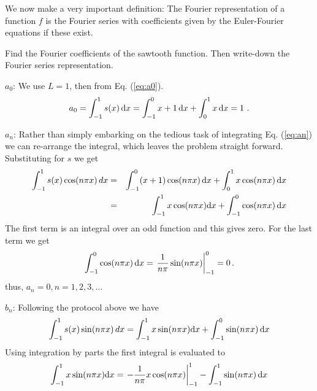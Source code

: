 \noindent We now make a very important definition: The Fourier representation of a function $f$ is the Fourier
series with coefficients given by the Euler-Fourier equations if these exist.  

\begin{example}
	Find the Fourier coefficients of the sawtooth function. Then write-down the Fourier series representation.
	
	\bigskip
	
	\noindent $a_0$: We use $L=1$, then from Eq. (\ref{eq:a0}).
	\begin{equation}
		a_0 = \int_{-1}^1 s(x) \, \mathrm{d} x = \int_{-1}^0 x + 1\, \mathrm{d} x + \int_{0}^1 x \, \mathrm{d} x = 1 \ .  
	\end{equation}
	

	\noindent $a_n$: Rather than simply embarking on the tedious task of integrating Eq. 
	(\ref{eq:an}) we can re-arrange the integral, which leaves the problem straight forward. 
	Substituting for $s$ we get 
	\begin{eqnarray}
		\int_{-1}^1 s(x) \cos(n\pi x) \, dx &=& \int_{-1}^0 (x+1) \cos(n\pi x) \, \mathrm{d} x + \int_{0}^1 
			x\cos(n\pi x) \, \mathrm{d} x \nonumber \\
			&=& \int_{-1}^1 x \cos(n\pi x) \mathrm{d} x + \int_{-1}^0 \cos(n \pi x) \, \mathrm{d} x
	\end{eqnarray}
	The first term is an integral over an odd function and this gives zero. For the last 
	term we get 
	\begin{equation}
		 \int_{-1}^0 \cos(n \pi x) \, \mathrm{d} x = \left. \frac{1}{n\pi} \sin (n\pi x)\right|_{-1}^0 = 0 \, .
	\end{equation}
	thus, $a_n=0, n = 1,2,3,\ldots$ 

	\noindent $b_n$: Following the protocol above we have  
		\begin{eqnarray}
		\int_{-1}^1 s(x) \sin(n\pi x) \, dx  
			= \int_{-1}^1 x \sin(n\pi x) \mathrm{d} x + \int_{-1}^0 \sin(n \pi x) \, \mathrm{d} x
			\label{eq:sfourierb2}
		\end{eqnarray}
		Using integration by parts the first integral is evaluated to 
		\begin{eqnarray}
			 \int_{-1}^1 x \sin(n\pi x) \mathrm{d} x = \left .  - \frac{1}{n\pi}
			 x\cos(n\pi x)\right|_{-1}^1 - \int_{-1}^1 \sin(n\pi x) \, \mathrm{d} x
		 \end{eqnarray}
	

\end{example}

